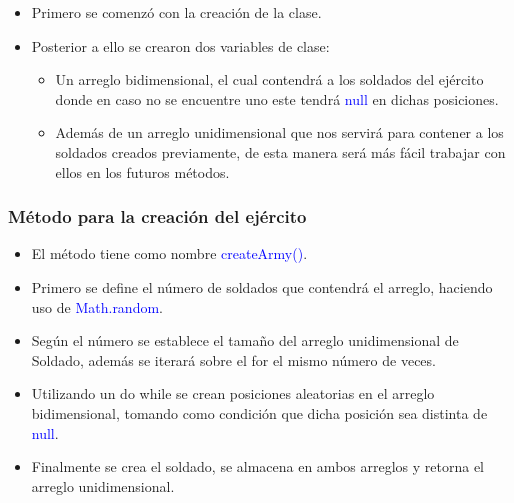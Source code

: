 \documentclass{article}
\begin{document}
        \begin{itemize}
            \item Primero se comenzó con la creación de la clase. 
            \item Posterior a ello se crearon dos variables de clase: 
            \begin{itemize}
                \item Un arreglo bidimensional, el cual contendrá a los soldados del ejército donde en caso no se encuentre uno este tendrá \textcolor{blue}{null} en dichas posiciones.
                \item Además de un arreglo unidimensional que nos servirá para contener a los soldados creados previamente, de esta manera será más fácil trabajar con ellos en los futuros métodos.
            \end{itemize}
        \end{itemize}

        
    
        \subsubsection{Método para la creación del ejército}

        \begin{itemize}
            \item El método tiene como nombre \textcolor{blue}{createArmy()}.
            \item Primero se define el número de soldados que contendrá el arreglo, haciendo uso de \textcolor{blue}{Math.random}.
            \item Según el número se establece el tamaño del arreglo unidimensional de Soldado, además se iterará sobre el for el mismo número de veces.
            \item Utilizando un do while se crean posiciones aleatorias en el arreglo bidimensional, tomando como condición que dicha posición sea distinta de \textcolor{blue}{null}.
            \item Finalmente se crea el soldado, se almacena en ambos arreglos y retorna el arreglo unidimensional.
        \end{itemize}

        
\end{document}
